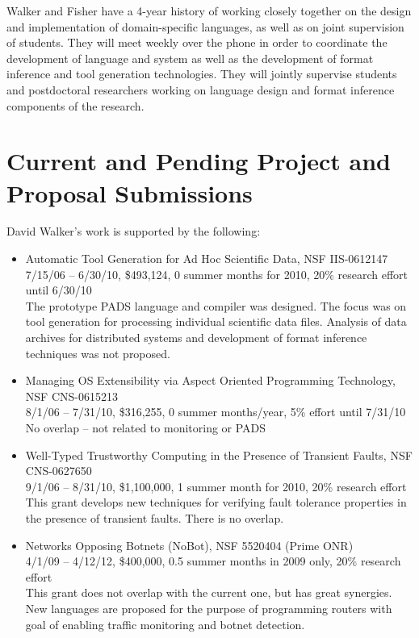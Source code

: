 \documentclass[12pt]{article}
\begin{document}
Walker and Fisher have a 4-year history of working closely together on
the design and implementation of domain-specific languages, as well as
on joint supervision of students.  They will meet weekly over the
phone in order to coordinate the development of \pads{} language and
system as well as the development of format inference and tool
generation technologies.  They will jointly supervise students and
postdoctoral researchers working on language design and format
inference components of the research.

\section{Current and Pending Project and Proposal Submissions}

David Walker's work is supported by the following:

\begin{itemize}
\item Automatic Tool Generation for Ad Hoc Scientific Data, 
NSF   IIS-0612147 \\
7/15/06 -- 6/30/10, \$493,124, 0 summer months for 2010, 
20\% research effort until 6/30/10 \\
The prototype PADS language and compiler was designed.  The focus
was on tool generation for processing individual scientific data
files.  Analysis of data archives for distributed systems and
development of format inference techniques was not proposed.

\item Managing OS Extensibility via Aspect Oriented Programming Technology, 
NSF   CNS-0615213 \\
8/1/06 -- 7/31/10, \$316,255, 0 summer months/year, 
5\% effort until 7/31/10 \\
No overlap -- not related to monitoring or PADS

\item Well-Typed Trustworthy Computing in the Presence of Transient Faults, 
NSF   CNS-0627650 \\
9/1/06 -- 8/31/10, \$1,100,000, 1 summer month for 2010, 
20\% research effort \\
This grant develops new techniques for verifying fault tolerance
properties in the presence of transient faults.  There is no overlap.

\item Networks Opposing Botnets (NoBot),
NSF   5520404 (Prime ONR) \\
4/1/09 -- 4/12/12, \$400,000, 0.5 summer months in 2009 only,
20\% research effort \\
This grant does not overlap with the current one, but has great
synergies.  New languages are proposed for the purpose of programming
routers with goal of enabling traffic monitoring and botnet detection.

\end {itemize}
\end{document}
